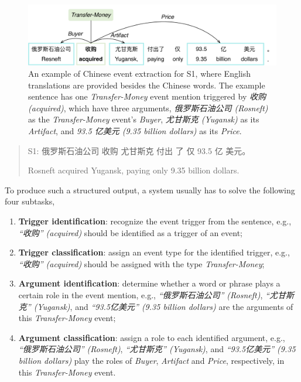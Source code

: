 \begin{figure}
\centering
\includegraphics[width=.9\textwidth]{example.pdf}
\caption{An example of Chinese event extraction for S1, where English translations are provided besides the Chinese words. The example sentence has one \emph{Transfer-Money} event mention triggered by \textit{收购 (acquired)}, which have three arguments, \textit{俄罗斯石油公司 (Rosneft)} as the \emph{Transfer-Money} event's \textit{Buyer}, \textit{尤甘斯克 (Yugansk)}  as its \textit{Artifact}, and \textit{93.5 亿美元 (9.35 billion dollars)} as its \textit{Price}.}
\label{exfigure}
\end{figure}

\begin{quote}
S1: 俄罗斯石油公司 \hspace{0.3cm}收购 \hspace{0.3cm}尤甘斯克 \hspace{0.3cm}付出 \hspace{0.2cm}了 \hspace{0.2cm}仅 \hspace{0.3cm}93.5 \hspace{0.3cm}亿 \hspace{0.3cm}美元。

\hspace{0.52cm} Rosneft acquired Yugansk, paying only 9.35 billion dollars.
\end{quote}

To produce such a structured output, a system usually has to solve the following four subtasks,
\begin{enumerate}
	\item \textbf{Trigger identification}: recognize the event trigger from the sentence, e.g., \textit{``收购'' (acquired)} should be identified as a trigger of an event;
	\item \textbf{Trigger classification}: assign an event type for the identified trigger, e.g., \textit{``收购'' (acquired)} should be assigned with the type \emph{Transfer-Money};
	\item \textbf{Argument identification}: determine whether a word or phrase plays a certain role in the event mention, e.g., \textit{``俄罗斯石油公司'' (Rosneft)}, \textit{``尤甘斯克'' (Yugansk)}, and \textit{``93.5亿美元'' (9.35 billion dollars)} are the arguments of this \emph{Transfer-Money} event;
	\item \textbf{Argument classification}: assign a role to each identified argument, e.g., \textit{``俄罗斯石油公司'' (Rosneft)}, \textit{``尤甘斯克'' (Yugansk)}, and \textit{``93.5亿美元'' (9.35 billion dollars)} play the roles of \emph{Buyer}, \emph{Artifact} and \emph{Price}, respectively, in this  \emph{Transfer-Money} event.
\end{enumerate}



